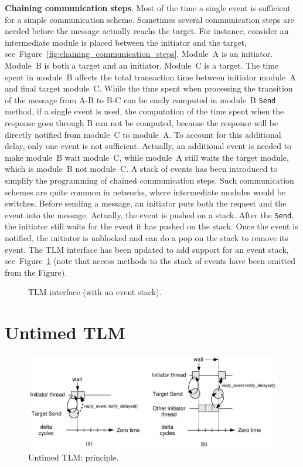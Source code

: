 \textbf{Chaining communication steps}. Most of the time a single event
is sufficient for a simple communication scheme. Sometimes several
communication steps are needed before the message actually reachs the
target. For instance, consider an intermediate module is placed
between the initiator and the target,
see~Figure~\ref{fig:chaining_communication_steps}.  Module~A is an
initiator. Module~B is both a target and an initiator. Module~C is a
target. The time spent in module~B affects the total transaction time
between initiator module~A and final target module~C. While the time
spent when processing the transition of the message from A-B to B-C
can be easily computed in module~B \texttt{Send} method, if a single
event is used, the computation of the time spent when the response
goes through B can not be computed, because the response will be
directly notified from module~C to module~A. To account for this
additional delay, only one event is not sufficient. Actually, an
additional event is needed to make module~B wait module~C, while
module~A still waits the target module, which is module~B not
module~C. A stack of events has been introduced to simplify the
programming of chained communication steps. Such communication schemes
are quite common in networks, where intermediate modules would be
switches. Before sending a message, an initiator puts both the request
and the event into the message. Actually, the event is pushed on a
stack. After the \texttt{Send}, the initiator still waits for the
event it has pushed on the stack. Once the event is notified, the
initiator is unblocked and can do a pop on the stack to remove its
event. The TLM interface has been updated to add support for an event
stack, see~Figure~\ref{fig:interface3} (note that access methods to
the stack of events have been omitted from the Figure).

\begin{figure}[h]
  \begin{center}
    
    \caption{\label{fig:interface3} TLM interface (with an event stack).}
  \end{center}
\end{figure}

\section{Untimed TLM}
\label{sec:untimed_tlm}

\begin{figure}[h]
  \begin{center}
    \includegraphics[width=\textwidth]{tlm/utlm_principle.pdf}
    \caption{\label{fig:utlm_principle} Untimed TLM: principle.}
  \end{center}
\end{figure}


